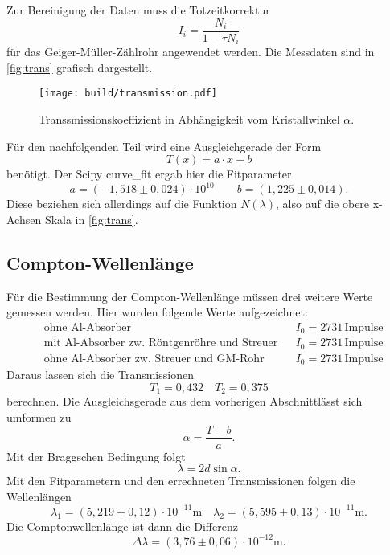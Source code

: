 Zur Bereinigung der Daten muss die Totzeitkorrektur 
\[
	I_i = \frac{N_i}{1 - \tau N_i}
\]
für das Geiger-Müller-Zählrohr angewendet werden.
Die Messdaten sind in \autoref{fig:trans} grafisch dargestellt.
\begin{figure}
	\centering
	\texttt{[image: build/transmission.pdf]}
	\caption{Transsmissionskoeffizient in Abhängigkeit vom Kristallwinkel $\alpha$.}
	\label{fig:trans}
\end{figure}
Für den nachfolgenden Teil wird eine Ausgleichgerade der Form 
\[
	T(x) = a\cdot x + b
\]
benötigt. Der Scipy curve\_fit ergab hier die Fitparameter
\begin{equation}
	a = (-1,518 \pm 0,024) \cdot 10^{10}
	\qquad
	b = (1,225 \pm 0,014).
\end{equation}
Diese beziehen sich allerdings auf die Funktion $N(\lambda)$, also auf die obere x-Achsen
Skala in \autoref{fig:trans}.

\newpage
\subsection{Compton-Wellenlänge}
\label{sec:Compton-Wellenlänge}
Für die Bestimmung der Compton-Wellenlänge müssen drei weitere Werte gemessen werden. Hier
wurden folgende Werte aufgezeichnet:
\begin{align*}
	&\text{ohne Al-Absorber} & & I_0 = 2731 \, \text{Impulse} \\
	&\text{mit Al-Absorber zw. Röntgenröhre und Streuer} & & I_0 = 2731 \, \text{Impulse} \\
	&\text{ohne Al-Absorber zw. Streuer und GM-Rohr} & & I_0 = 2731 \, \text{Impulse}
\end{align*}
Daraus lassen sich die Transmissionen
\begin{equation}
	T_1 = 0,432 \quad
	T_2 = 0,375
\end{equation}
berechnen. Die Ausgleichsgerade aus dem vorherigen Abschnittlässt sich umformen zu
\[ \alpha = \frac{T - b}{a}. \]
Mit der Braggschen Bedingung folgt 
\[
	\lambda = 2d \sin\alpha.
\]
Mit den Fitparametern und den errechneten Transmissionen folgen die Wellenlängen
\begin{equation}
	\lambda_1 = (5,219 \pm 0,12) \cdot 10^{-11} \si{\meter}
	\quad
	\lambda_2 = (5,595 \pm 0,13) \cdot 10^{-11} \si{\meter}.
\end{equation}
Die Comptonwellenlänge ist dann die Differenz
\[
	\Delta \lambda = (3,76 \pm 0,06) \cdot 10^{-12} \si{\meter}.
\]
	
